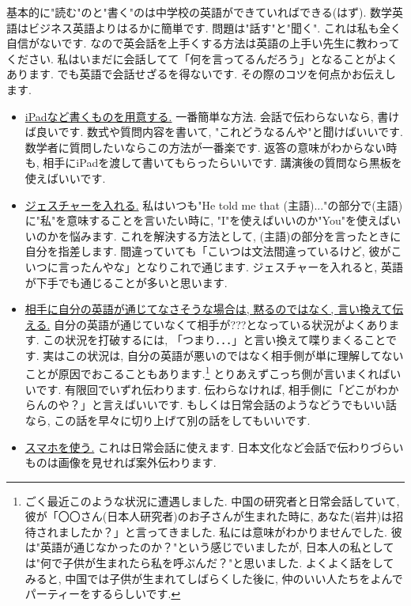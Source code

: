 基本的に"読む"のと"書く"のは中学校の英語ができていればできる(はず). 数学英語はビジネス英語よりはるかに簡単です. 
問題は"話す"と"聞く". これは私も全く自信がないです. なので英会話を上手くする方法は英語の上手い先生に教わってください. 
私はいまだに会話してて「何を言ってるんだろう」となることがよくあります. でも英語で会話せざるを得ないです. 
その際のコツを何点かお伝えします. 
\begin{itemize}[left=0pt]
  \setlength{\parskip}{0cm} %
  \setlength{\itemsep}{8pt} %
\item \underline{iPadなど書くものを用意する.} 一番簡単な方法. 会話で伝わらないなら, 書けば良いです. 数式や質問内容を書いて, "これどうなるんや"と聞けばいいです. 
数学者に質問したいならこの方法が一番楽です. 返答の意味がわからない時も, 相手にiPadを渡して書いてもらったらいいです. 講演後の質問なら黒板を使えばいいです. 
\item \underline{ジェスチャーを入れる.}  私はいつも"He told me that (主語)..."の部分で(主語)に"私"を意味することを言いたい時に, "I"を使えばいいのか"You"を使えばいいのかを悩みます. 
これを解決する方法として, (主語)の部分を言ったときに自分を指差します. 間違っていても「こいつは文法間違っているけど, 彼がこいつに言ったんやな」となりこれで通じます. ジェスチャーを入れると, 英語が下手でも通じることが多いと思います. 
\item \underline{相手に自分の英語が通じてなさそうな場合は, 黙るのではなく, 言い換えて伝える.} 自分の英語が通じていなくて相手が???となっている状況がよくあります. この状況を打破するには, 「つまり．．．」と言い換えて喋りまくることです. 実はこの状況は, 自分の英語が悪いのではなく相手側が単に理解してないことが原因でおこることもあります.\footnote{ごく最近このような状況に遭遇しました. 中国の研究者と日常会話していて, 彼が「〇〇さん(日本人研究者)のお子さんが生まれた時に, あなた(岩井)は招待されましたか？」と言ってきました. 私には意味がわかりませんでした. 彼は"英語が通じなかったのか？"という感じでいましたが, 日本人の私としては"何で子供が生まれたら私を呼ぶんだ？"と思いました. よくよく話をしてみると, 中国では子供が生まれてしばらくした後に, 仲のいい人たちをよんでパーティーをするらしいです. } 
とりあえずこっち側が言いまくればいいです. 有限回でいずれ伝わります. 伝わらなければ, 相手側に「どこがわからんのや？」と言えばいいです. もしくは日常会話のようなどうでもいい話なら, この話を早々に切り上げて別の話をしてもいいです. 
\item \underline{スマホを使う.} これは日常会話に使えます. 日本文化など会話で伝わりづらいものは画像を見せれば案外伝わります.  
\end{itemize}

